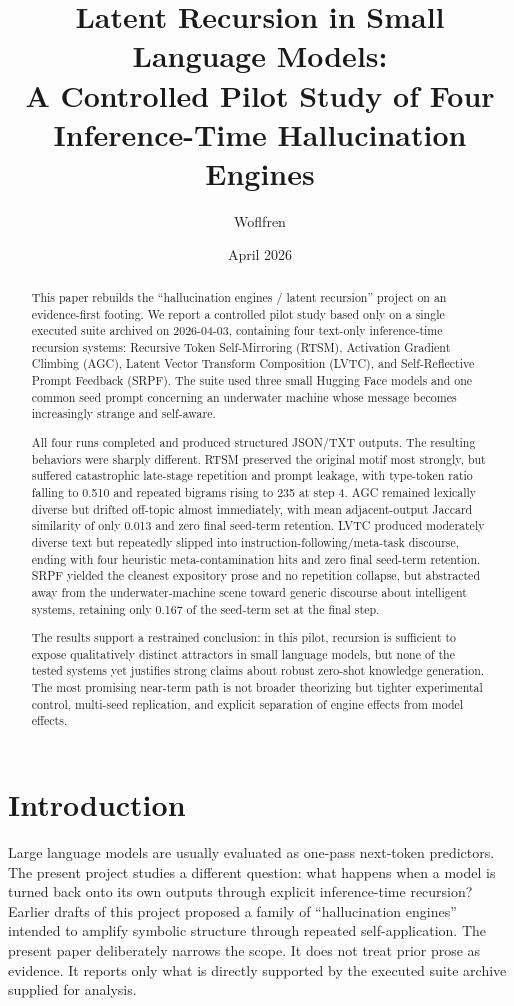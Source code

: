 \documentclass[11pt]{article}
\title{\textbf{Latent Recursion in Small Language Models:}\\
A Controlled Pilot Study of Four Inference-Time Hallucination Engines}
\author{Woflfren}
\date{April 2026}
\begin{document}
\maketitle

\begin{abstract}
This paper rebuilds the ``hallucination engines / latent recursion'' project on an evidence-first footing. We report a controlled pilot study based only on a single executed suite archived on 2026-04-03, containing four text-only inference-time recursion systems: Recursive Token Self-Mirroring (RTSM), Activation Gradient Climbing (AGC), Latent Vector Transform Composition (LVTC), and Self-Reflective Prompt Feedback (SRPF). The suite used three small Hugging Face models and one common seed prompt concerning an underwater machine whose message becomes increasingly strange and self-aware. 

All four runs completed and produced structured JSON/TXT outputs. The resulting behaviors were sharply different. RTSM preserved the original motif most strongly, but suffered catastrophic late-stage repetition and prompt leakage, with type-token ratio falling to 0.510 and repeated bigrams rising to 235 at step 4. AGC remained lexically diverse but drifted off-topic almost immediately, with mean adjacent-output Jaccard similarity of only 0.013 and zero final seed-term retention. LVTC produced moderately diverse text but repeatedly slipped into instruction-following/meta-task discourse, ending with four heuristic meta-contamination hits and zero final seed-term retention. SRPF yielded the cleanest expository prose and no repetition collapse, but abstracted away from the underwater-machine scene toward generic discourse about intelligent systems, retaining only 0.167 of the seed-term set at the final step.

The results support a restrained conclusion: in this pilot, recursion is sufficient to expose qualitatively distinct attractors in small language models, but none of the tested systems yet justifies strong claims about robust zero-shot knowledge generation. The most promising near-term path is not broader theorizing but tighter experimental control, multi-seed replication, and explicit separation of engine effects from model effects.
\end{abstract}

\section{Introduction}
Large language models are usually evaluated as one-pass next-token predictors. The present project studies a different question: what happens when a model is turned back onto its own outputs through explicit inference-time recursion? Earlier drafts of this project proposed a family of ``hallucination engines'' intended to amplify symbolic structure through repeated self-application. The present paper deliberately narrows the scope. It does not treat prior prose as evidence. It reports only what is directly supported by the executed suite archive supplied for analysis.
\end{document}
